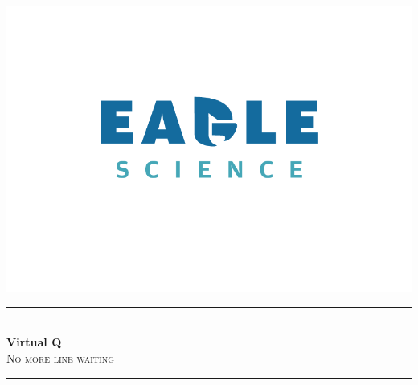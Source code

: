 \documentclass[11pt]{book}
\begin{document}
    \begin{titlepage} %
        \newcommand{\HRule}{\rule{\linewidth}{0.5mm}} %

        \center %



        \includegraphics[width=15cm]{gfx/EagleScience_Logo_on_white}



        \HRule\\[0.4cm]

        {\huge\bfseries Virtual Q }\\[0.4cm] %

        \textsc{\large No more line waiting}\\[0.5cm] %
        \HRule\\[1.5cm]


\end{titlepage}
\end{document}
